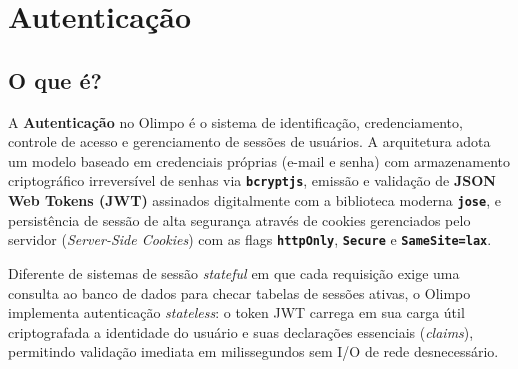 \documentclass[12pt,a4paper]{article}
\begin{document}
\section{Autenticação}

\subsection{O que é?}
A \textbf{Autenticação} no Olimpo é o sistema de identificação, credenciamento, controle de acesso e gerenciamento de sessões de usuários. A arquitetura adota um modelo baseado em credenciais próprias (e-mail e senha) com armazenamento criptográfico irreversível de senhas via \textbf{\texttt{bcryptjs}}, emissão e validação de \textbf{JSON Web Tokens (JWT)} assinados digitalmente com a biblioteca moderna \textbf{\texttt{jose}}, e persistência de sessão de alta segurança através de cookies gerenciados pelo servidor (\textit{Server-Side Cookies}) com as flags \textbf{\texttt{httpOnly}}, \textbf{\texttt{Secure}} e \textbf{\texttt{SameSite=lax}}.

Diferente de sistemas de sessão \textit{stateful} em que cada requisição exige uma consulta ao banco de dados para checar tabelas de sessões ativas, o Olimpo implementa autenticação \textit{stateless}: o token JWT carrega em sua carga útil criptografada a identidade do usuário e suas declarações essenciais (\textit{claims}), permitindo validação imediata em milissegundos sem I/O de rede desnecessário.
\end{document}
